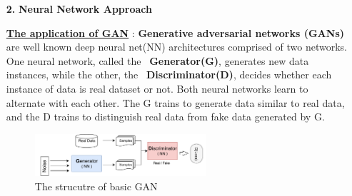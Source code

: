 \documentclass[11pt]{article}
\begin{document}
\begin{itemize}
	
	
		
	\item[\textbf{2.}] \textbf{Neural Network Approach}

	\item[]\underline{\textbf{The application of GAN}} : \textbf{Generative adversarial networks (GANs)} are well known deep neural net(NN) architectures comprised of two networks. One neural network, called the  \textbf{Generator(G)}, generates new data instances, while the other, the  \textbf{Discriminator(D)}, decides whether each instance of data is real dataset or not. Both neural networks learn to alternate with each other. The G trains to generate data similar to real data, and the D trains to distinguish real data from fake data generated by G. 

		\begin{figure}[h] 
		\begin{center}
			\includegraphics[width=0.6\textwidth]{GAN_basic}
			\caption{The strucutre of basic GAN} \label{fig:GAN-basic}
		\end{center}
	\end{figure}


\end{itemize}
\end{document}
